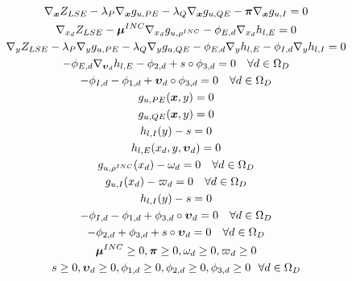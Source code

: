 \documentclass[journal]{IEEEtran}
\begin{document}
\begin{gather}
{\nabla_{\boldsymbol{x}}}{Z_{LSE}} - {\lambda _P}{\nabla _{\boldsymbol{x}}}{g_{u,PE}} - {\lambda _Q}{\nabla _{\boldsymbol{x}}}{g_{u,QE}} - \boldsymbol{\pi} {\nabla _{\boldsymbol{x}}}{g_{u,I}} = 0{\rm{    }}\\
{\nabla _{{x_d}}}{Z_{LSE}} - {\boldsymbol{\mu} ^{INC}}{\nabla _{{x_d}}}{g_{u,{\rho ^{INC}}}} - {\phi _{E,d}}{\nabla _{{x_d}}}{h_{l,E}} = 0{\rm{    }}\\
{\nabla _y}{Z_{LSE}} - {\lambda _P}{\nabla _y}{g_{u,PE}} - {\lambda _Q}{\nabla _y}{g_{u,QE}} - {\phi _{E,d}}{\nabla _y}{h_{l,E}} - {\phi _{I,d}}{\nabla _y}{h_{l,I}} = 0{\rm{    }}\\
 - {\phi _{E,d}}{\nabla _{{\boldsymbol{\upsilon} _d}}}{h_{l,E}} - {\phi _{2,d}} + s \circ {\phi _{3,d}} = 0{\rm{    }}~~~\forall d \in {\Omega _D}\\
- {\phi _{I,d}} - {\phi _{1,d}} + {\boldsymbol{\upsilon} _d} \circ {\phi _{3,d}} = 0{\rm{    }}~~~\forall d \in {\Omega _D}\\
{g_{u,PE}}(\boldsymbol{x},y) = 0\\
{g_{u,QE}}(\boldsymbol{x},y) = 0\\
{h_{l,I}}(y) - s = 0{\rm{ }}\\
{h_{l,E}}({x_d},y,{\boldsymbol{\upsilon} _d}) = 0\\
{g_{u,{\rho ^{INC}}}}({x_d}) - {\omega _d} = 0{\rm{    }}~~~\forall d \in {\Omega _D}\\
{g_{u,I}}({x_d}) - {\varpi _d} = 0{\rm{    }}~~~\forall d \in {\Omega _D}\\
{h_{l,I}}(y) - s = 0{\rm{ }}\\
- {\phi _{I,d}} - {\phi _{1,d}} + {\phi _{3,d}} \circ {\boldsymbol{\upsilon} _d} = 0{\rm{    }}~~~\forall d \in {\Omega _D}\\
 - {\phi _{2,d}} + {\phi _{3,d}} + s \circ {\boldsymbol{\upsilon} _d} = 0{\rm{    }}~~~\forall d \in {\Omega _D}\\
{\boldsymbol{\mu} ^{INC}} \ge 0,\boldsymbol{\pi}  \ge 0,{\omega _d} \ge 0,{\varpi _d} \ge 0\\
s \ge 0,{\boldsymbol{\upsilon} _d} \ge 0,{\phi _{1,d}} \ge 0,{\phi _{2,d}} \ge 0,{\phi _{3,d}} \ge 0{\rm{    }}~~\forall d \in {\Omega _D}
\end{gather}
\end{document}
